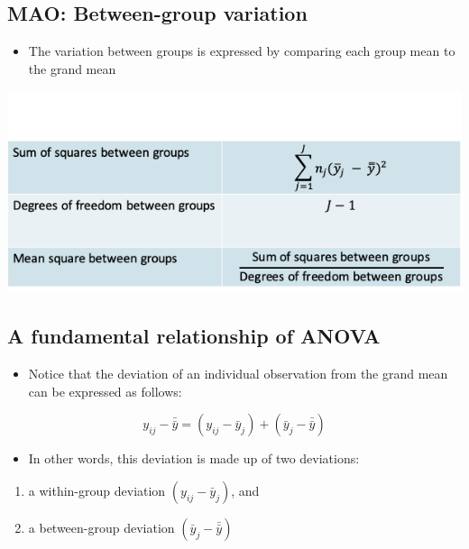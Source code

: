 \documentclass[
]{book}
\providecommand{\tightlist}{%
  \setlength{\itemsep}{0pt}\setlength{\parskip}{0pt}}
\begin{document}
\hypertarget{mao-between-group-variation}{%
\subsection{MAO: Between-group variation}\label{mao-between-group-variation}}

\begin{itemize}
\tightlist
\item
  The variation between groups is expressed by comparing each group mean to the grand mean
\end{itemize}

\includegraphics[width=1\linewidth]{./10_25}

\hypertarget{a-fundamental-relationship-of-anova}{%
\subsection{A fundamental relationship of ANOVA}\label{a-fundamental-relationship-of-anova}}

\begin{itemize}
\tightlist
\item
  Notice that the deviation of an individual observation from the grand mean can be expressed as follows:
\end{itemize}

\[y_{ij}-\bar{\bar y}=(y_{ij}-\bar y_j)+(\bar y_j-\bar{\bar y})\]

\begin{itemize}
\tightlist
\item
  In other words, this deviation is made up of two deviations:\\
\end{itemize}

\begin{enumerate}
\def\labelenumi{\arabic{enumi})}
\tightlist
\item
  a within-group deviation \((y_{ij}-\bar y_j)\), and\\
\item
  a between-group deviation \((\bar y_j-\bar{\bar y})\)
\end{enumerate}
\end{document}
